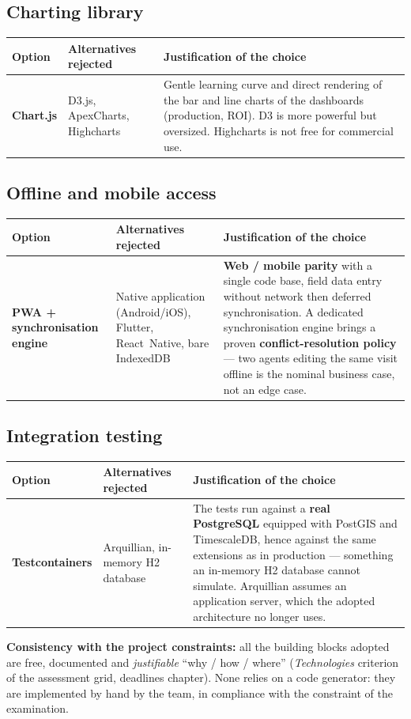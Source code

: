 \subsection{Charting library}
\begin{xltabular}{\textwidth}{>{\bfseries}p{2.7cm} p{4.2cm} X}
\toprule
\textbf{Option} & \textbf{Alternatives rejected} & \textbf{Justification of the choice} \\
\midrule
\endhead
Chart.js & D3.js, ApexCharts, Highcharts & Gentle learning curve and direct rendering of the bar and line charts of the dashboards (production, ROI). D3 is more powerful but oversized. Highcharts is not free for commercial use. \\
\bottomrule
\end{xltabular}

\subsection{Offline and mobile access}
\begin{xltabular}{\textwidth}{>{\bfseries}p{2.7cm} p{4.2cm} X}
\toprule
\textbf{Option} & \textbf{Alternatives rejected} & \textbf{Justification of the choice} \\
\midrule
\endhead
PWA + synchronisation engine & Native application (Android/iOS), Flutter, React~Native, bare IndexedDB & \textbf{Web / mobile parity} with a single code base, field data entry without network then deferred synchronisation. A dedicated synchronisation engine brings a proven \textbf{conflict-resolution policy} --- two agents editing the same visit offline is the nominal business case, not an edge case. \\
\bottomrule
\end{xltabular}

\subsection{Integration testing}
\begin{xltabular}{\textwidth}{>{\bfseries}p{2.7cm} p{4.2cm} X}
\toprule
\textbf{Option} & \textbf{Alternatives rejected} & \textbf{Justification of the choice} \\
\midrule
\endhead
Testcontainers & Arquillian, in-memory H2 database & The tests run against a \textbf{real PostgreSQL} equipped with PostGIS and TimescaleDB, hence against the same extensions as in production --- something an in-memory H2 database cannot simulate. Arquillian assumes an application server, which the adopted architecture no longer uses. \\
\bottomrule
\end{xltabular}

\begin{encadre}
\textbf{Consistency with the project constraints:} all the building blocks
adopted are free, documented and \emph{justifiable} ``why / how / where''
(\emph{Technologies} criterion of the assessment grid, deadlines chapter). None
relies on a code generator: they are implemented by hand by the team, in
compliance with the constraint of the examination.
\end{encadre}
